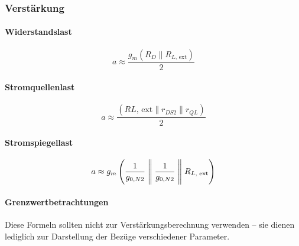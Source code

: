 \subsubsection{Verstärkung}

\paragraph{Widerstandslast}

\[
    a \approx \frac{g_m (R_D \parallel R_{L\text{, ext}})}{2}
\]

\paragraph{Stromquellenlast}

\[
    a \approx \frac{ (R{L\text{, ext}} \parallel r_{DS2} \parallel r_{QL})}{2}
\]

\paragraph{Stromspiegellast}

\[
    a \approx g_m \left(\frac{1}{g_{0, N2}} \Biggm\Vert \frac{1}{g_{0, N2}} \Biggm\Vert R_{L\text{, ext}}\right)
\]

\paragraph{Grenzwertbetrachtungen}
\medskip%

Diese Formeln sollten nicht zur Verstärkungsberechnung verwenden -- sie dienen lediglich zur Darstellung der Bezüge verschiedener Parameter.
